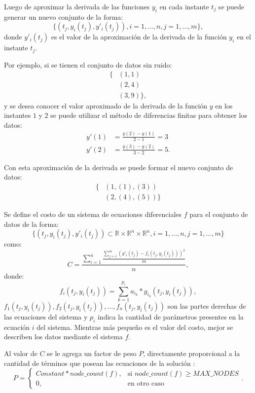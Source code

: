 Luego de aproximar la derivada de las funciones $y_i$ en cada instante $t_j$ se puede generar un nuevo conjunto de la forma:
$$\{(t_j, y_i(t_j), y'_{i}(t_j)), i = 1, \dots, n, j = 1, \dots, m\},$$
donde $y'_{i}(t_j)$ es el valor de la aproximación de la derivada de la función $y_i$ en el instante $t_j$.

Por ejemplo, si se tienen el conjunto de datos sin ruido:
\begin{align*}
    \{ & (1, 1)     \\
       & (2, 4)     \\
       & (3, 9) \},
\end{align*}
y se desea conocer el valor aproximado de la derivada de la función $y$ en los instantes $1$ y $2$ se puede utilizar el método de diferencias finitas para obtener los datos:
\begin{align*}
    y'(1) & = \frac{y(2) - y(1)}{2 - 1} = 3  \\
    y'(2) & = \frac{y(3) - y(2)}{3 - 2} = 5.
\end{align*}

Con esta aproximación de la derivada se puede formar el nuevo conjunto de datos:
\begin{align*}
    \{ & (1, (1), (3))    \\
       & (2, (4), (5)) \}
\end{align*}

Se define el costo de un sistema de ecuaciones diferenciales $f$ para el conjunto de datos de la forma:
$$\{(t_j, y_i(t_j), y'_i(t_j)) \subset \mathbb{R} \times \mathbb{R}^{n} \times \mathbb{R}^n, i = 1, \dots, n, j = 1, \dots, m\}$$
como:
$$C = \frac{\sum_{i=1}^n\frac{\sum_{j=1}^{m}(y'_i(t_j) - f_i(t_j, y_i(t_j)))^2}{m}}{n},$$
donde:
$$f_i(t_j, y_i(t_j)) = \sum_{k=1}^{p_i} a_{i_k} * g_{i_k}(t_j, y_i(t_j)),$$
$f_1(t_j, y_i(t_j)), f_2(t_j, y_i(t_j)), \dots, f_n(t_j, y_i(t_j))$ son las partes derechas de las ecuaciones del sistema y $p_i$ indica la cantidad de parámetros presentes en la ecuación $i$ del sistema. Mientras más pequeño es el valor del costo, mejor se describen los datos mediante el sistema $f$.

Al valor de $C$ se le agrega un factor de peso $P$, directamente proporcional a la cantidad de términos que posean las ecuaciones de la solución \cite{gplearnbloat}:
$$P = \begin{cases}
        Constant * node\_count(f), & \text{si } node\_count(f) \geq MAX\_NODES \\
        0,                         & \text{en otro caso}
    \end{cases}.$$

